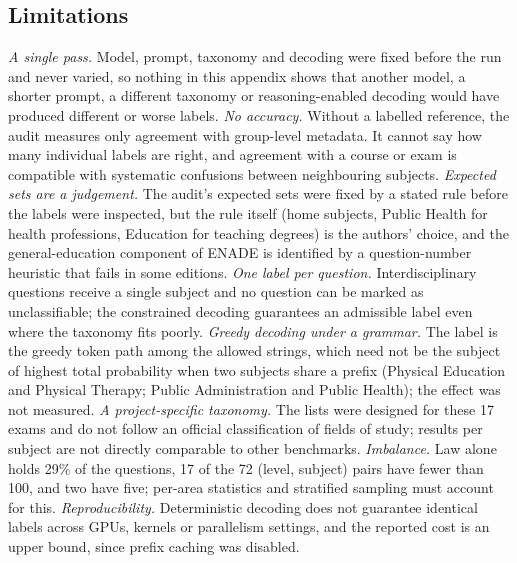 \subsection{Limitations}
\label{app:kc-limitations}

\emph{A single pass.} Model, prompt, taxonomy and decoding were fixed before
the run and never varied, so nothing in this appendix shows that another
model, a shorter prompt, a different taxonomy or reasoning-enabled decoding
would have produced different or worse labels.
\emph{No accuracy.} Without a labelled reference, the audit measures only
agreement with group-level metadata. It cannot say how many individual
labels are right, and agreement with a course or exam is compatible with
systematic confusions between neighbouring subjects.
\emph{Expected sets are a judgement.} The audit's expected sets were fixed by
a stated rule before the labels were inspected, but the rule itself (home
subjects, Public Health for health professions, Education for teaching
degrees) is the authors' choice, and the general-education component of ENADE
is identified by a question-number heuristic that fails in some editions.
\emph{One label per question.} Interdisciplinary questions receive a single
subject and no question can be marked as unclassifiable; the constrained
decoding guarantees an admissible label even where the taxonomy fits
poorly.
\emph{Greedy decoding under a grammar.} The label is the greedy token path
among the allowed strings, which need not be the subject of highest total
probability when two subjects share a prefix (Physical Education and
Physical Therapy; Public Administration and Public Health); the effect was
not measured.
\emph{A project-specific taxonomy.} The lists were designed for these 17
exams and do not follow an official classification of fields of study;
results per subject are not directly comparable to other benchmarks.
\emph{Imbalance.} Law alone holds 29\% of the questions, 17 of the 72
(level, subject) pairs have fewer than 100, and two have five; per-area
statistics and stratified sampling must account for this.
\emph{Reproducibility.} Deterministic decoding does not guarantee identical
labels across GPUs, kernels or parallelism settings, and the reported cost is
an upper bound, since prefix caching was disabled.
